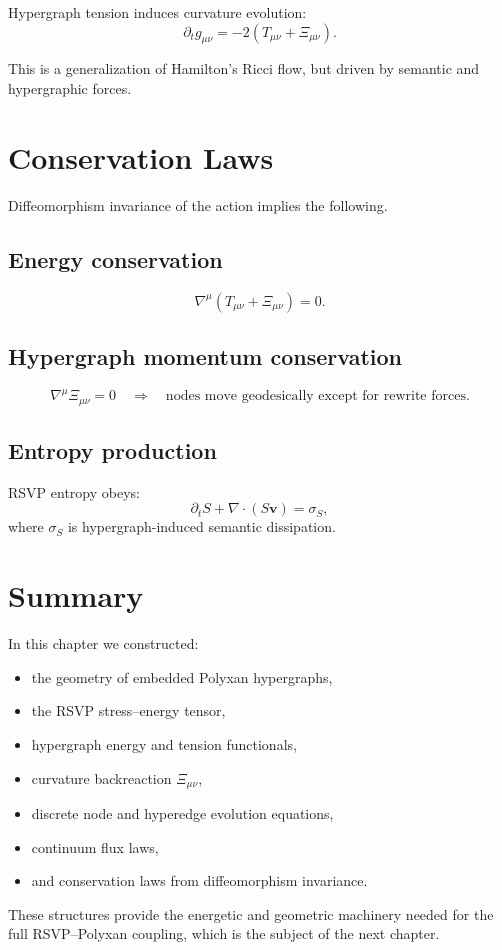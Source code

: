 Hypergraph tension induces curvature evolution:
\[
\partial_t g_{\mu\nu}
=
-2\left(
T_{\mu\nu}+\Xi_{\mu\nu}
\right).
\]

This is a generalization of Hamilton’s Ricci flow, but driven by semantic and
hypergraphic forces.

\section{Conservation Laws}

Diffeomorphism invariance of the action implies the following.

\subsection{Energy conservation}

\[
\nabla^\mu(T_{\mu\nu}+\Xi_{\mu\nu})=0.
\]

\subsection{Hypergraph momentum conservation}

\[
\nabla^\mu \Xi_{\mu\nu}=0
\quad\Rightarrow\quad
\text{nodes move geodesically except for rewrite forces}.
\]

\subsection{Entropy production}

RSVP entropy obeys:
\[
\partial_t S + \nabla\cdot(S\mathbf{v}) = \sigma_S,
\]
where $\sigma_S$ is hypergraph-induced semantic dissipation.

\section{Summary}

In this chapter we constructed:
\begin{itemize}
  \item the geometry of embedded Polyxan hypergraphs,
  \item the RSVP stress–energy tensor,
  \item hypergraph energy and tension functionals,
  \item curvature backreaction $\Xi_{\mu\nu}$,
  \item discrete node and hyperedge evolution equations,
  \item continuum flux laws,
  \item and conservation laws from diffeomorphism invariance.
\end{itemize}

These structures provide the energetic and geometric machinery needed for the
full RSVP–Polyxan coupling, which is the subject of the next chapter.
